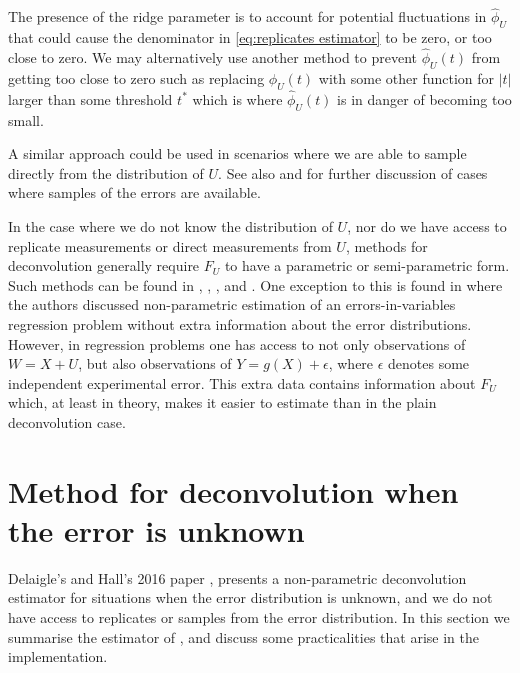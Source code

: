 
	The presence of the ridge parameter is to account for potential fluctuations in $\hat{\phi}_U$ that could cause the denominator in \eqref{eq:replicates estimator} to be zero, or too close to zero. We may alternatively use another method to prevent $\hat{\phi}_U(t)$ from getting too close to zero such as replacing $\hat{\phi}_U(t)$ with some other function for $|t|$ larger than some threshold $t^*$ which is where $\hat{\phi}_U(t)$ is in danger of becoming too small.

	A similar approach could be used in scenarios where we are able to sample directly from the distribution of $U$. See also \cite{Diggle1993-jy} and \cite{Neumann1997-cr} for further discussion of cases where samples of the errors are available.

	In the case where we do not know the distribution of $U$, nor do we have access to replicate measurements or direct measurements from $U$, methods for deconvolution generally require $F_U$ to have a parametric or semi-parametric form. Such methods can be found in \cite{Butucea2005-be}, \cite{Meister2006-nu}, \cite{Butucea2008-wm}, and \cite{Kneip2012-aa}. One exception to this is found in \cite{Schennach2013-yv} where the authors discussed non-parametric estimation of an errors-in-variables regression problem without extra information about the error distributions. However, in regression problems one has access to not only observations of $W = X+ U$, but also observations of $Y = g(X) + \epsilon$, where $\epsilon$ denotes some independent experimental error. This extra data contains information about $F_U$ which, at least in theory, makes it easier to estimate than in the plain deconvolution case.
 
\section{Method for deconvolution when the error is unknown}
\label{sec:summary of delaigle hall}
	Delaigle's and Hall's 2016 paper \cite{Delaigle2016-la}, presents a non-parametric deconvolution estimator for situations when the error distribution is unknown, and we do not have access to replicates or samples from the error distribution. %
	In this section we summarise the estimator of \cite{Delaigle2016-la}, and discuss some practicalities that arise in the implementation. 

